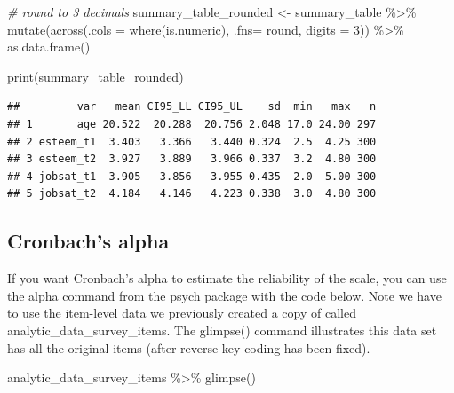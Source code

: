 \documentclass[
]{krantz}
\makeatletter
\newenvironment{Shaded}{\begin{snugshade}}{\end{snugshade}}
\newcommand{\AttributeTok}[1]{\textcolor[rgb]{0.61,0.61,0.61}{#1}}
\newcommand{\CommentTok}[1]{\textcolor[rgb]{0.37,0.37,0.37}{\textit{#1}}}
\newcommand{\DecValTok}[1]{\textcolor[rgb]{0.06,0.06,0.06}{#1}}
\newcommand{\FunctionTok}[1]{\textcolor[rgb]{0,0,0}{#1}}
\newcommand{\NormalTok}[1]{#1}
\newcommand{\OtherTok}[1]{\textcolor[rgb]{0.37,0.37,0.37}{#1}}
\newcommand{\SpecialCharTok}[1]{\textcolor[rgb]{0,0,0}{#1}}
\newenvironment{kframe}{%
\medskip{}
\setlength{\fboxsep}{.8em}
 \def\at@end@of@kframe{}%
 \ifinner\ifhmode%
  \def\at@end@of@kframe{\end{minipage}}%
  \begin{minipage}{\columnwidth}%
 \fi\fi%
 \def\FrameCommand##1{\hskip\@totalleftmargin \hskip-\fboxsep
 \colorbox{shadecolor}{##1}\hskip-\fboxsep
     \hskip-\linewidth \hskip-\@totalleftmargin \hskip\columnwidth}%
 \MakeFramed {\advance\hsize-\width
   \@totalleftmargin\z@ \linewidth\hsize
   \@setminipage}}%
 {\par\unskip\endMakeFramed%
 \at@end@of@kframe}
\renewenvironment{Shaded}{\begin{kframe}}{\end{kframe}}
\makeatother
\begin{document}
\begin{Shaded}
\begin{Highlighting}[]
\CommentTok{\# round to 3 decimals}
\NormalTok{summary\_table\_rounded }\OtherTok{\textless{}{-}}\NormalTok{ summary\_table }\SpecialCharTok{\%\textgreater{}\%}
  \FunctionTok{mutate}\NormalTok{(}\FunctionTok{across}\NormalTok{(}\AttributeTok{.cols =} \FunctionTok{where}\NormalTok{(is.numeric),}
                \AttributeTok{.fns=}\NormalTok{ round,}
                \AttributeTok{digits =} \DecValTok{3}\NormalTok{)) }\SpecialCharTok{\%\textgreater{}\%}
  \FunctionTok{as.data.frame}\NormalTok{()}

\FunctionTok{print}\NormalTok{(summary\_table\_rounded)}
\end{Highlighting}
\end{Shaded}

\begin{verbatim}
##         var   mean CI95_LL CI95_UL    sd  min   max   n
## 1       age 20.522  20.288  20.756 2.048 17.0 24.00 297
## 2 esteem_t1  3.403   3.366   3.440 0.324  2.5  4.25 300
## 3 esteem_t2  3.927   3.889   3.966 0.337  3.2  4.80 300
## 4 jobsat_t1  3.905   3.856   3.955 0.435  2.0  5.00 300
## 5 jobsat_t2  4.184   4.146   4.223 0.338  3.0  4.80 300
\end{verbatim}

\hypertarget{cronbachs-alpha}{%
\subsection{Cronbach's alpha}\label{cronbachs-alpha}}

If you want Cronbach's alpha to estimate the reliability of the scale, you can use the alpha command from the psych package with the code below. Note we have to use the item-level data we previously created a copy of called analytic\_data\_survey\_items. The glimpse() command illustrates this data set has all the original items (after reverse-key coding has been fixed).

\begin{Shaded}
\begin{Highlighting}[]
\NormalTok{analytic\_data\_survey\_items }\SpecialCharTok{\%\textgreater{}\%}
  \FunctionTok{glimpse}\NormalTok{()}
\end{Highlighting}
\end{Shaded}
\end{document}
